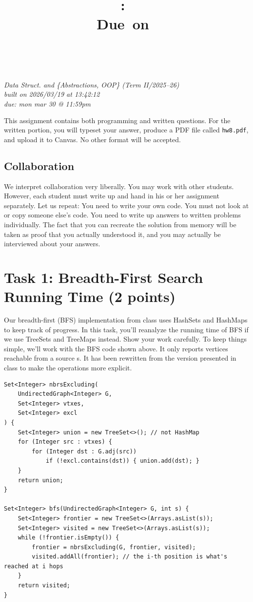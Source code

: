 \documentclass{article}
\title{
    \vspace{2in}
    \textmd{\textbf{\hmwkClass:\ \hmwkTitle}}\\
    \normalsize\vspace{0.1in}\small{Due\ on\ \hmwkDueDate}\\
    \vspace{0.1in}\large{\textit{\hmwkClassInstructor\ \hmwkClassTime}}
    \vspace{3in}
}
\author{\hmwkAuthorName}
\date{}
\theoremstyle{remark}
\begin{document}
\maketitle
\begin{center}
    \textit{Data Struct. and \{Abstractions, OOP\} (Term II/2025--26)}\\
    \textit{built on 2026/03/19 at 13:42:12}\\
    \textit{due: mon mar 30 @ 11:59pm}
\end{center}
\newpage

This assignment contains both programming and written questions. For the written portion, you
will typeset your answer, produce a PDF file called \texttt{hw8.pdf}, and upload it to Canvas. No other format
will be accepted.

\subsection*{Collaboration}

We interpret collaboration very liberally. You may work with other students. However, each student
must write up and hand in his or her assignment separately. Let us repeat: You need to write your
own code. You must not look at or copy someone else’s code. You need to write up answers to written
problems individually. The fact that you can recreate the solution from memory will be taken as proof
that you actually understood it, and you may actually be interviewed about your answers.

\newpage

\section*{Task 1: Breadth-First Search Running Time (2 points)}

Our breadth-first (BFS) implementation from class uses HashSets and HashMaps to keep track of
progress. In this task, you’ll reanalyze the running time of BFS if we use TreeSets and TreeMaps instead.
Show your work carefully. To keep things simple, we’ll work with the BFS code shown above. It only
reports vertices reachable from a source s. It has been rewritten from the version presented in class to
make the operations more explicit.

\begin{verbatim}
Set<Integer> nbrsExcluding(
    UndirectedGraph<Integer> G,
    Set<Integer> vtxes,
    Set<Integer> excl
) {
    Set<Integer> union = new TreeSet<>(); // not HashMap
    for (Integer src : vtxes) {
        for (Integer dst : G.adj(src))
            if (!excl.contains(dst)) { union.add(dst); }
    }
    return union;
}

Set<Integer> bfs(UndirectedGraph<Integer> G, int s) {
    Set<Integer> frontier = new TreeSet<>(Arrays.asList(s));
    Set<Integer> visited = new TreeSet<>(Arrays.asList(s));
    while (!frontier.isEmpty()) {
        frontier = nbrsExcluding(G, frontier, visited);
        visited.addAll(frontier); // the i-th position is what's reached at i hops
    }
    return visited;
}
\end{verbatim}
\end{document}
